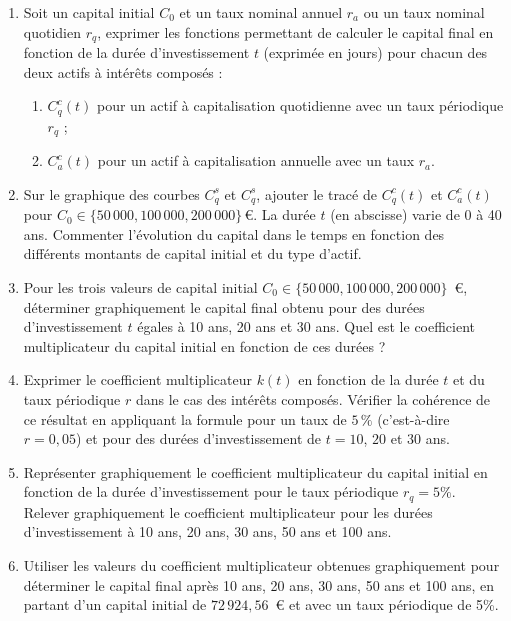 \documentclass{article}
\begin{document}
\begin{enumerate}[label=\textbf{Q2.\arabic*}]
                \item Soit un capital initial \( C_0 \) et un taux nominal annuel \( r_a \) ou un taux nominal quotidien \( r_q \), exprimer les fonctions permettant de calculer le capital final en fonction de la durée d'investissement \( t \) (exprimée en jours) pour chacun des deux actifs à intérêts composés :
                \begin{enumerate}[label=(\alph*)]
                    \item \( C^c_q(t) \) pour un actif à capitalisation quotidienne avec un taux périodique \( r_q \) ;
                \item \( C^c_a(t) \) pour un actif à capitalisation annuelle avec un taux \( r_a \).
                \end{enumerate}

                \item Sur le graphique des courbes $C^s_q$ et $C^s_q$, ajouter le tracé de \( C^c_q(t) \) et \( C^c_a(t) \) pour \( C_0 \in \{50\,000, 100\,000, 200\,000\} \, \text{€} \). La durée \( t \) (en abscisse) varie de 0 à 40 ans. Commenter l'évolution du capital dans le temps en fonction des différents montants de capital initial et du type d'actif.

                \item Pour les trois valeurs de capital initial \( C_0 \in \{50\,000, 100\,000, 200\,000\} \)~€, déterminer graphiquement le capital final obtenu pour des durées d'investissement \( t \) égales à 10 ans, 20 ans et 30 ans. Quel est le coefficient multiplicateur du capital initial en fonction de ces durées ?

                \item Exprimer le coefficient multiplicateur \( k(t) \) en fonction de la durée \( t \) et du taux périodique \( r \) dans le cas des intérêts composés. Vérifier la cohérence de ce résultat en appliquant la formule pour un taux de \( 5\,\% \) (c'est-à-dire \( r=0,05 \)) et pour des durées d'investissement de \( t=10 \), \( 20 \) et \( 30 \) ans.

                \item Représenter graphiquement le coefficient multiplicateur du capital initial en fonction de la durée d’investissement pour le taux périodique $r_q = 5\%$. Relever graphiquement le coefficient multiplicateur pour les durées d’investissement à 10 ans, 20 ans, 30 ans, 50 ans et 100 ans.
                
                \item Utiliser les valeurs du coefficient multiplicateur obtenues graphiquement pour déterminer le capital final après 10 ans, 20 ans, 30 ans, 50 ans et 100 ans, en partant d'un capital initial de $72\,924,56$\ € et avec un taux périodique de 5\%.
                
            \end{enumerate}
\end{document}
